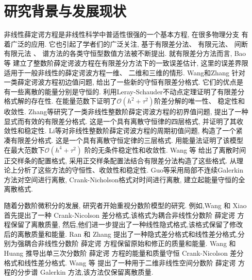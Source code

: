 \section{研究背景与发展现状}
非线性薛定谔方程是非线性科学中普适性很强的一个基本方程, 在很多物理分支 有着广泛的应用. 它也引起了学者们的广泛关注, 基于有限差分法\cite{liFastEnergyConserving2018}、 有限元法\cite{karakashianSpacetimeFiniteElement1998}、 间断有限元法\cite{zhangConservativeLocalDiscontinuous2017} 、 谱方法\cite{gongConservativeFourierPseudospectral2017}的各类守恒型数值方法被不断提出. 
就有限差分方法而言, Bao等\cite{baoUniformErrorEstimates2012} 建立了整数阶薛定谔波方程在有限差分方法下的一致误差估计, 这里的误差界限适用于一般非线性的薛定谔波方程一维、 二维和三维的情形. 
Wang和Zhang\cite{wangAnalysisNewConservative2006} 针对一类薛定谔波方程初边值问题, 给出了一些新的守恒有限差分格式. 它们的优点是有一些离散的能量分别是守恒的. 利用Leray-Schauder不动点定理证明了有限差分 格式解的存在性. 
在能量范数下证明了$\mathcal{O}(h^2+\tau^2)$阶差分解的唯一性、 稳定性和收敛性. Zhang等\cite{zhangConservativeNumericalScheme2003}研究了一类非线性整数阶薛定谔波方程的初界值问题, 提出了一种显式而有效的有限差分格式. 
这是一个具有离散守恒律的四层格式, 并证明了其收敛性和稳定性. Li等\cite{liCompactFiniteDifference2012}对非线性整数阶薛定谔波方程的周期初值问题, 构造了一个紧凑有限差分格式. 
这是一个具有离散守恒定律的三层格式. 用能量法证明了该模型在最大范数下$\mathcal{O}(h^4+\tau^2)$ 阶的无条件稳定性和收敛性. Wang 等\cite{wangDiscretetimeOrthogonalSpline2011} 给出了离散时间正交样条的配置格式, 采用正交样条配置法结合有限差分法构造了这些格式. 
从理论上分析了这些方法的守恒性、收敛性和稳定性. Guo等\cite{guoEnergyConservingLocal2015}采用局部不连续Galerkin方法对空间进行离散, Crank-Nicholson格式对时间进行离散, 建立起能量守恒的全离散格式. 

随着分数阶微积分的发展, 研究者开始重视分数阶模型的研究.
例如,Wang 和 Xiao \cite{wangCrankNicolsonDifference2013} 首先提出了一种 Crank-Nicolson 差分格式,该格式为耦合非线性分数阶 薛定谔 方程保留了离散质量,
然后,他们进一步提出了一种线性隐式格式,该格式保留了修改后的离散质量和能量\cite{wangLinearlyImplicitConservative2014}. 
Ran 和 Zhang \cite{ranConservativeDifferenceScheme2016} 提出了一种隐式差分格式和线性差分格式,分别为强耦合非线性分数阶 薛定谔 方程保留原始和修正的质量和能量. 
Wang 和 Huang \cite{wangEnergyConservativeDifference2015,wangConservativeLinearizedDifference2015} 推导出单三次分数阶 薛定谔 方程的能量和质量守恒 Crank-Nicolson 差分格式和线性差分格式.
Wang 等 \cite{wangSplitstepSpectralGalerkin2019} 提出了一种用于二维非线性空间分数阶 薛定谔 方程的分步谱 Galerkin 方法,该方法仅保留离散质量.

